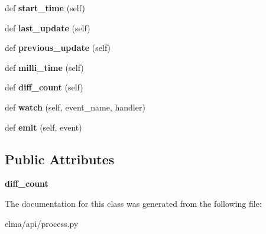 \begin{DoxyCompactItemize}
\mbox{\label{classelma_1_1api_1_1process_1_1Process_aa37c2ece596b3580990332709564345f}} 
def {\bfseries start\+\_\+time} (self)
\item 
\mbox{\label{classelma_1_1api_1_1process_1_1Process_aef00f41f3c8bab2b49329d05ce83f534}} 
def {\bfseries last\+\_\+update} (self)
\item 
\mbox{\label{classelma_1_1api_1_1process_1_1Process_a47488e16165e28243766c7a6f5a51e32}} 
def {\bfseries previous\+\_\+update} (self)
\item 
\mbox{\label{classelma_1_1api_1_1process_1_1Process_a65c2b15f6f42435a532aafd62631cc1d}} 
def {\bfseries milli\+\_\+time} (self)
\item 
\mbox{\label{classelma_1_1api_1_1process_1_1Process_abbe3f746bdaa56b1166e37c6622e93f9}} 
def {\bfseries diff\+\_\+count} (self)
\item 
\mbox{\label{classelma_1_1api_1_1process_1_1Process_afb8d0a01fbbf47d20fdd97d3b9d0e2e9}} 
def {\bfseries watch} (self, event\+\_\+name, handler)
\item 
\mbox{\label{classelma_1_1api_1_1process_1_1Process_aaefd6d23649bf1bb0674dad7e2cebef8}} 
def {\bfseries emit} (self, event)
\end{DoxyCompactItemize}
\subsection*{Public Attributes}
\begin{DoxyCompactItemize}
\item 
\mbox{\label{classelma_1_1api_1_1process_1_1Process_a37f72d81499fbbf8a3beaeff06d62202}} 
{\bfseries diff\+\_\+count}
\end{DoxyCompactItemize}


The documentation for this class was generated from the following file\+:\begin{DoxyCompactItemize}
\item 
elma/api/process.\+py\end{DoxyCompactItemize}
